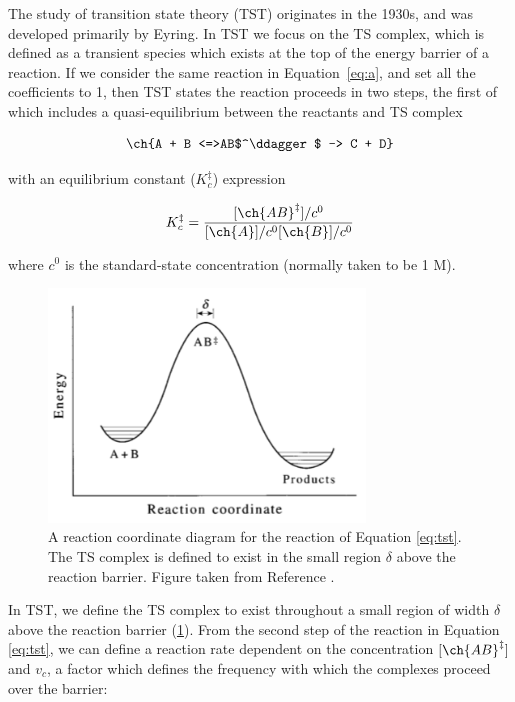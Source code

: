 The study of transition state theory (TST) originates in the 1930s, and was
developed primarily by Eyring.\cite{McQuarrie1997,Steinfeld1998} In TST we focus
on the TS complex, which is defined as a transient species which exists at the
top of the energy barrier of a reaction. If we consider the same reaction in
Equation~\ref{eq:a}, and set all the coefficients to 1, then TST states the
reaction proceeds in two steps, the first of which includes a quasi-equilibrium
between the reactants and TS complex

\begin{equation}
  \ch{A + B <=>AB$^\ddagger$ -> C + D}
  \label{eq:tst}
\end{equation}

\noindent with an equilibrium constant ($K_c^{\ddagger}$) expression

\begin{equation}
  K_c^{\ddagger} = \frac{[\ch{AB}^\ddagger]/c^0}{[\ch{A}]/c^0[\ch{B}]/c^0}
\label{eq:K}
\end{equation}

\noindent where $c^0$ is the standard-state concentration (normally taken to be
1 M).

\begin{figure}[htb]
    \centering
    \includegraphics[width=0.75\textwidth]{figures/TST-PES.png}
    \caption[A reaction coordinate diagram for a generic reaction.]{A reaction
      coordinate diagram for the reaction of Equation \ref{eq:tst}. The TS complex is
      defined to exist in the small region $\delta$ above the reaction
      barrier. Figure taken from Reference {\protect{}}.}
    \label{fig:tst-pes}
\end{figure}

In TST, we define the TS complex to exist throughout a small region of width
$\delta$ above the reaction barrier (\ref{fig:tst-pes}). From the second step of
the reaction in Equation \ref{eq:tst}, we can define a reaction rate dependent
on the concentration $[\ch{AB}^\ddagger]$ and $v_c$, a factor which defines the
frequency with which the complexes proceed over the barrier:

